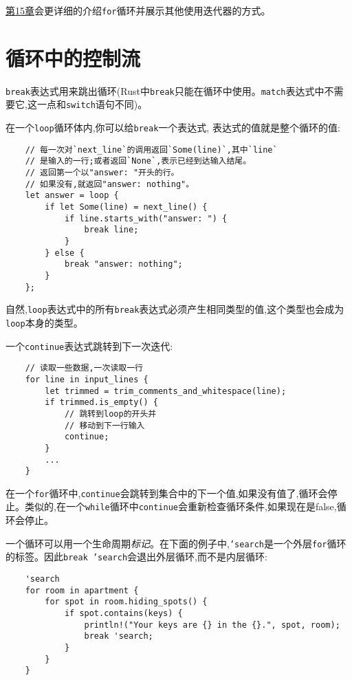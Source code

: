 \hyperref[ch15]{第15章}会更详细的介绍\texttt{for}循环并展示其他使用迭代器的方式。

\section{循环中的控制流}

\texttt{break}表达式用来跳出循环(Rust中\texttt{break}只能在循环中使用。\texttt{match}表达式中不需要它,这一点和\texttt{switch}语句不同)。

在一个\texttt{loop}循环体内,你可以给\texttt{break}一个表达式,
表达式的值就是整个循环的值:
\begin{verbatim}
    // 每一次对`next_line`的调用返回`Some(line)`,其中`line`
    // 是输入的一行;或者返回`None`,表示已经到达输入结尾。
    // 返回第一个以"answer: "开头的行。
    // 如果没有,就返回"answer: nothing"。
    let answer = loop {
        if let Some(line) = next_line() {
            if line.starts_with("answer: ") {
                break line;
            }
        } else {
            break "answer: nothing";
        }
    };
\end{verbatim}

自然,\texttt{loop}表达式中的所有\texttt{break}表达式必须产生相同类型的值,这个类型也会成为\texttt{loop}本身的类型。

一个\texttt{continue}表达式跳转到下一次迭代:
\begin{verbatim}
    // 读取一些数据,一次读取一行
    for line in input_lines {
        let trimmed = trim_comments_and_whitespace(line);
        if trimmed.is_empty() {
            // 跳转到loop的开头并
            // 移动到下一行输入
            continue;
        }
        ...
    }
\end{verbatim}

在一个\texttt{for}循环中,\texttt{continue}会跳转到集合中的下一个值,如果没有值了,循环会停止。类似的,在一个\texttt{while}循环中\texttt{continue}会重新检查循环条件,如果现在是false,循环会停止。

一个循环可以用一个生命周期\emph{标记}。在下面的例子中,\texttt{'search}是一个外层\texttt{for}循环的标签。因此\texttt{break 'search}会退出外层循环,而不是内层循环:
\begin{verbatim}
    'search
    for room in apartment {
        for spot in room.hiding_spots() {
            if spot.contains(keys) {
                println!("Your keys are {} in the {}.", spot, room);
                break 'search;
            }
        }
    }
\end{verbatim}

